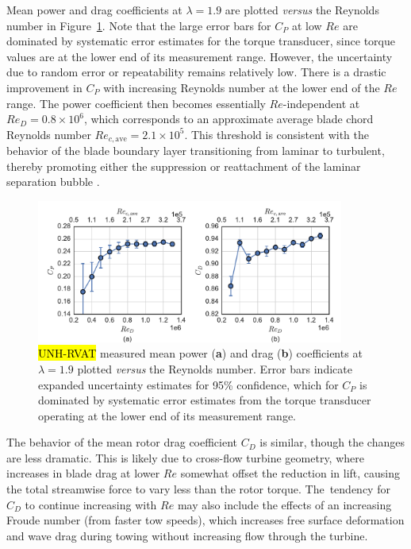 \documentclass[energies,article,accept,moreauthors,pdftex,10pt,a4paper]{mdpi}
\theoremstyle{mdpi}
\newcounter{ex}
\newcounter{re}
\begin{document}
Mean power and drag coefficients at $\lambda=1.9$ are plotted \textit{versus}
the Reynolds number in Figure~\ref{fig:perf-Re-dep}. Note that the large error
bars for $C_P$ at low $Re$ are dominated by systematic error estimates for the
torque transducer, since torque values are at the lower end of its measurement
range. However, the uncertainty due to random error or repeatability remains
relatively low. There is a drastic improvement in $C_P$ with increasing Reynolds
number at the lower end of the $Re$ range. The power coefficient then becomes
essentially $Re$-independent at $Re_D = 0.8 \times 10^6$, which corresponds to
an approximate average blade chord Reynolds number $Re_{c, \mathrm{ave}} = 2.1
\times 10^5$. This threshold is consistent with the behavior of the blade
boundary layer transitioning from laminar to turbulent, thereby promoting either
the suppression or reattachment of the laminar separation bubble
\cite{Lissaman1983}.



\begin{figure}[H]
\centering

\includegraphics[width=0.9\textwidth]{figures/perf_re_dep}
\caption{\hl {UNH-RVAT} measured mean power (\textbf{a}) and drag (\textbf{b})
    coefficients at $\lambda=1.9$ plotted \textit{versus} the Reynolds number. Error
    bars indicate expanded uncertainty estimates for 95\% confidence, which for
    $C_P$ is dominated by systematic error estimates from the torque transducer
    operating at the lower end of its measurement range.}

\label{fig:perf-Re-dep}
\end{figure}

The behavior of the mean rotor drag coefficient $C_D$ is similar, though the
changes are less dramatic. This is likely due to cross-flow turbine geometry,
where increases in blade drag at lower $Re$ somewhat offset the reduction in
lift, causing the total streamwise force to vary less than the rotor torque.
The~tendency for $C_D$ to continue increasing with $Re$ may also include the
effects of an increasing Froude number (from faster tow speeds), which increases
free surface deformation and wave drag during towing without increasing flow
through the turbine.
\end{document}
